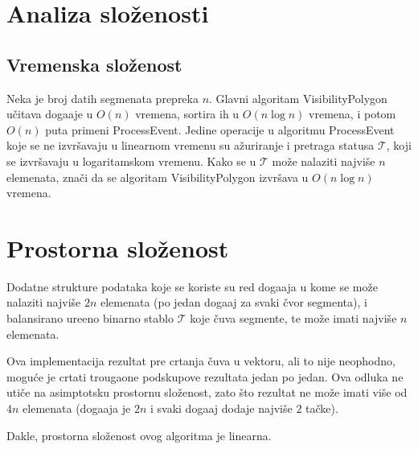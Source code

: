 \documentclass{article}
\newcommand{\Proc}[1]{\textsf{#1}}                     %
\begin{document}
\section{Analiza slo\v zenosti}
\subsection{Vremenska slo\v zenost}
Neka je broj datih segmenata prepreka $n$.
Glavni algoritam \Proc{VisibilityPolygon} u\v citava doga\dj aje u $O(n)$ vremena, sortira ih u $O(n\log n)$ vremena, i potom $O(n)$ puta primeni \Proc{ProcessEvent}.
Jedine operacije u algoritmu \Proc{ProcessEvent} koje se ne izvr\v savaju u linearnom vremenu su a\v zuriranje i pretraga statusa $\mathcal{T}$, koji se izvr\v savaju u logaritamskom vremenu. Kako se u $\mathcal{T}$ mo\v ze nalaziti najvi\v se $n$ elemenata, zna\v ci da se algoritam \Proc{VisibilityPolygon} izvr\v sava u $O(n\log n)$ vremena.

\section{Prostorna slo\v zenost}
Dodatne strukture podataka koje se koriste su red doga\dj aja u kome se mo\v ze nalaziti najvi\v se $2n$ elemenata (po jedan doga\dj aj za svaki \v cvor segmenta), i balansirano ure\dj eno binarno stablo $\mathcal{T}$ koje \v cuva segmente, te mo\v ze imati najvi\v se $n$ elemenata. 

Ova implementacija rezultat pre crtanja \v cuva u vektoru, ali to nije neophodno, mogu\' ce je crtati trougaone podskupove rezultata jedan po jedan. Ova odluka ne uti\v ce na asimptotsku prostornu slo\v zenost, zato \v sto rezultat ne mo\v ze imati vi\v se od $4n$ elemenata (doga\dj aja je $2n$ i svaki doga\dj aj dodaje najvi\v se $2$ ta\v cke).

Dakle, prostorna slo\v zenost ovog algoritma je linearna.



\end{document}
